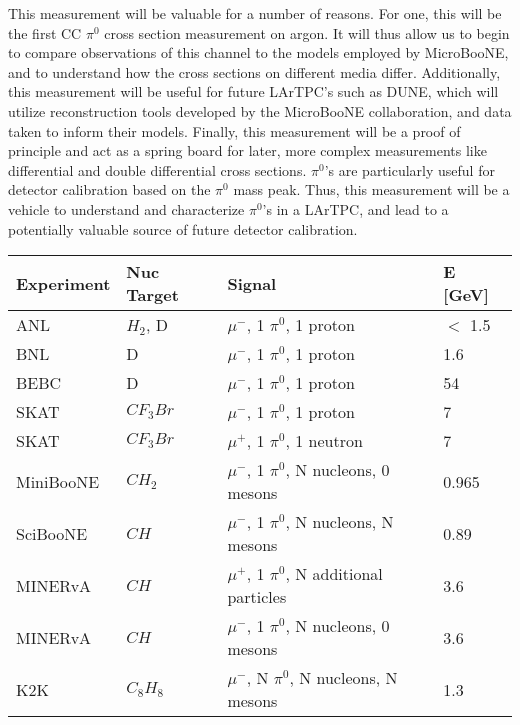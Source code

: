 This measurement will be valuable for a number of reasons.  For one, this will be the first CC $\pi^0$ cross section measurement on argon.  It will thus allow us to begin to compare observations of this channel to the models employed by MicroBooNE, and to understand how the cross sections on different media differ. Additionally, this measurement will be useful for future LArTPC's such as DUNE, which will utilize reconstruction tools developed by the MicroBooNE collaboration, and data taken to inform their models. Finally, this measurement will be a proof of principle and act as a spring board for later, more complex measurements like differential and double differential cross sections.  $\pi^0$'s are particularly useful for detector calibration based on the $\pi^0$ mass peak.  Thus, this measurement will be a vehicle to understand and characterize $\pi^0$'s in a LArTPC, and lead to a potentially valuable source of future detector calibration. 
\begin{table}[H]
 \centering
 \singlespacing
 \begin{tabular}{| l | l | l | l |}
  \hline
   Experiment & Nuc Target & Signal & E [GeV]\\ [0.1ex] \hline
 ANL \cite{bib:ANL1} & $H_2$, D & $\mu^-$, 1 $\pi^0$, 1 proton & $<$ 1.5 \\ 
 BNL \cite{bib:ANL2} & D & $\mu^-$, 1 $\pi^0$, 1 proton & 1.6 \\ 
 BEBC \cite{bib:HE_unknown1} & D & $\mu^-$, 1 $\pi^0$, 1 proton & 54 \\ 
 SKAT \cite{bib:HE_unknown2} & $CF_{3}Br$ & $\mu^-$, 1 $\pi^0$, 1 proton & 7 \\ 
 SKAT \cite{bib:HE_unknown2} & $CF_{3}Br$ & $\mu^+$, 1 $\pi^0$, 1 neutron & 7 \\ 
 MiniBooNE \cite{bib:miniboone_thesis} & $CH_2$ & $\mu^-$, 1 $\pi^0$, N nucleons, 0 mesons& 0.965 \\ 
 SciBooNE \cite{bib:sciboone_thesis} & $CH$ & $\mu^-$, 1 $\pi^0$, N nucleons, N mesons  & 0.89 \\
  MINERvA \cite{bib:minerva_thesis} & $CH$ & $\mu^+$, 1 $\pi^0$, N additional particles & 3.6 \\ 
  MINERvA \cite{bib:minerva_paper_2017} & $CH$ & $\mu^-$, 1 $\pi^0$, N nucleons, 0 mesons & 3.6 \\ 
 K2K \cite{bib:k2k_paper} & $C_{8}H_{8}$ & $\mu^-$, N $\pi^0$, N nucleons, N mesons& 1.3 \\ 
\hline
\end{tabular}
\end{table}

